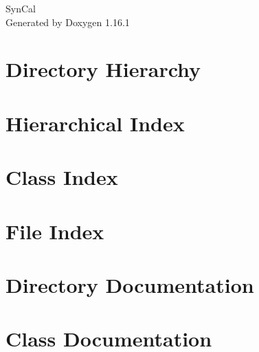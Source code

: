 \documentclass[twoside]{book}
\newcommand{\+}{\discretionary{\mbox{\scriptsize$\hookleftarrow$}}{}{}}
\newcommand{\clearemptydoublepage}{%
    \newpage{\pagestyle{empty}\cleardoublepage}%
  }
\begin{document}
  \raggedbottom
    \hypersetup{pageanchor=false,
                bookmarksnumbered=true,
                pdfencoding=unicode
               }
  \begin{titlepage}
  \vspace*{7cm}
  \begin{center}%
  {\Large Syn\+Cal}\\
  \vspace*{1cm}
  {\large Generated by Doxygen 1.16.1}\\
  \end{center}
  \end{titlepage}
  \clearemptydoublepage
  \tableofcontents
  \clearemptydoublepage
  \hypersetup{pageanchor=true}
\chapter{Directory Hierarchy}

\chapter{Hierarchical Index}

\chapter{Class Index}

\chapter{File Index}

\chapter{Directory Documentation}




\chapter{Class Documentation}



















\end{document}
